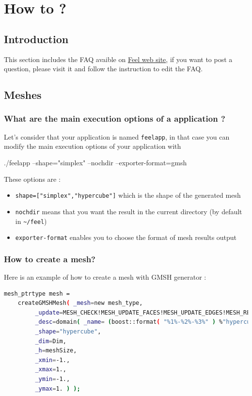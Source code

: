 \chapter{How to ?}
\label{sec:faq}

\section{Introduction}
\label{faq:intro}

This section includes the FAQ avaible on \href{https://trac.feelpp.org/wiki/FAQ}{Feel web site}, if you want to post a question, please visit it and follow the instruction to edit the FAQ.

\section{Meshes}
\label{faq:meshes}

\subsection{What are the main execution options of a \feel application ?}
Let's consider that your application is named \lstinline!feelapp!, in that case you can modify the main execution options of your application with
\begin{unixcom}
		./feelapp --shape="simplex" --nochdir --exporter-format=gmsh
\end{unixcom}
These options are :
\begin{itemize}
\item \lstinline!shape=["simplex","hypercube"]! which is the shape of the generated mesh
\item \lstinline!nochdir! means that you want the result in the current directory (by default in \lstinline!~/feel!)
\item \lstinline!exporter-format! enables you to choose the format of mesh results output
\end{itemize}

\subsection{How to create a mesh?}
Here is an example of how to create a mesh with GMSH generator :

\begin{lstlisting}[language=sh]
 mesh_ptrtype mesh =
	createGMSHMesh( _mesh=new mesh_type,
         _update=MESH_CHECK!MESH_UPDATE_FACES!MESH_UPDATE_EDGES!MESH_RENUMBER,
         _desc=domain( _name= (boost::format( "%1%-%2%-%3%" ) %"hypercube" %Dim %1).str(),
         _shape="hypercube",
         _dim=Dim,
         _h=meshSize,
         _xmin=-1.,
         _xmax=1.,
         _ymin=-1.,
         _ymax=1. ) );
\end{lstlisting}

